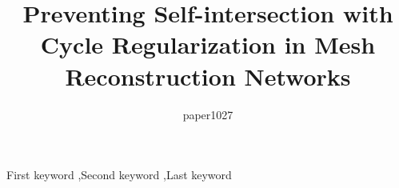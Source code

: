 \documentclass[final,3p]{elsarticle}
\begin{document}
\begin{frontmatter}
\title{Preventing Self-intersection with Cycle Regularization in Mesh Reconstruction Networks}

\author{paper1027}




\begin{keyword}
First keyword \sep Second keyword \sep Last keyword
\end{keyword}

\end{frontmatter}

\linenumbers








\end{document}
